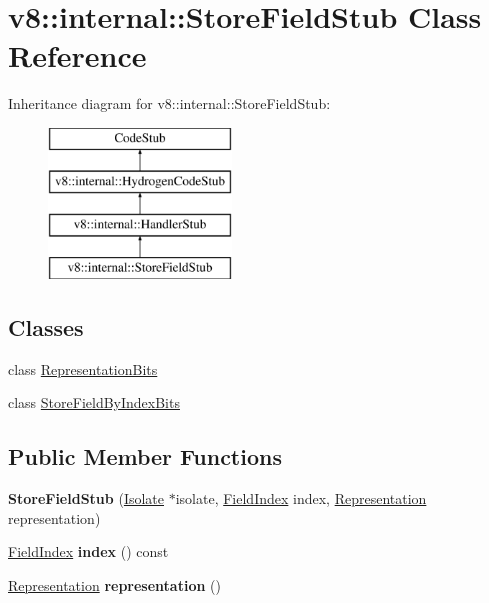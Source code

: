 \hypertarget{classv8_1_1internal_1_1_store_field_stub}{}\section{v8\+:\+:internal\+:\+:Store\+Field\+Stub Class Reference}
\label{classv8_1_1internal_1_1_store_field_stub}
Inheritance diagram for v8\+:\+:internal\+:\+:Store\+Field\+Stub\+:\begin{figure}[H]
\begin{center}
\leavevmode
\includegraphics[height=4.000000cm]{classv8_1_1internal_1_1_store_field_stub}
\end{center}
\end{figure}
\subsection*{Classes}
\begin{DoxyCompactItemize}
\item 
class \hyperlink{classv8_1_1internal_1_1_store_field_stub_1_1_representation_bits}{Representation\+Bits}
\item 
class \hyperlink{classv8_1_1internal_1_1_store_field_stub_1_1_store_field_by_index_bits}{Store\+Field\+By\+Index\+Bits}
\end{DoxyCompactItemize}
\subsection*{Public Member Functions}
\begin{DoxyCompactItemize}
\item 
{\bfseries Store\+Field\+Stub} (\hyperlink{classv8_1_1internal_1_1_isolate}{Isolate} $\ast$isolate, \hyperlink{classv8_1_1internal_1_1_field_index}{Field\+Index} index, \hyperlink{classv8_1_1internal_1_1_representation}{Representation} representation)\hypertarget{classv8_1_1internal_1_1_store_field_stub_aad2a3e75dd748e25e51b206b1d443bcc}{}\label{classv8_1_1internal_1_1_store_field_stub_aad2a3e75dd748e25e51b206b1d443bcc}

\item 
\hyperlink{classv8_1_1internal_1_1_field_index}{Field\+Index} {\bfseries index} () const \hypertarget{classv8_1_1internal_1_1_store_field_stub_a99afd151b0ee91a6f8c8829d38eaf67d}{}\label{classv8_1_1internal_1_1_store_field_stub_a99afd151b0ee91a6f8c8829d38eaf67d}

\item 
\hyperlink{classv8_1_1internal_1_1_representation}{Representation} {\bfseries representation} ()\hypertarget{classv8_1_1internal_1_1_store_field_stub_ab3f244d75ec239100293d7c6af45ec92}{}\label{classv8_1_1internal_1_1_store_field_stub_ab3f244d75ec239100293d7c6af45ec92}

\end{DoxyCompactItemize}
